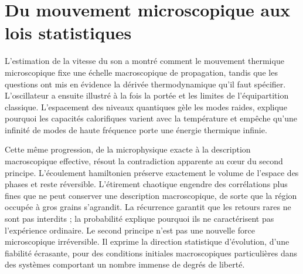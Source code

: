 \section{Du mouvement microscopique aux lois statistiques}

L’estimation de la vitesse du son a montré comment le mouvement thermique microscopique fixe une échelle macroscopique de propagation, tandis que les questions ont mis en évidence la dérivée thermodynamique qu’il faut spécifier. L’oscillateur a ensuite illustré à la fois la portée et les limites de l’équipartition classique. L’espacement des niveaux quantiques gèle les modes raides, explique pourquoi les capacités calorifiques varient avec la température et empêche qu’une infinité de modes de haute fréquence porte une énergie thermique infinie.

Cette même progression, de la microphysique exacte à la description macroscopique effective, résout la contradiction apparente au cœur du second principe. L’écoulement hamiltonien préserve exactement le volume de l’espace des phases et reste réversible. L’étirement chaotique engendre des corrélations plus fines que ne peut conserver une description macroscopique, de sorte que la région occupée à gros grains s’agrandit. La récurrence garantit que les retours rares ne sont pas interdits ; la probabilité explique pourquoi ils ne caractérisent pas l’expérience ordinaire. Le second principe n’est pas une nouvelle force microscopique irréversible. Il exprime la direction statistique d’évolution, d’une fiabilité écrasante, pour des conditions initiales macroscopiques particulières dans des systèmes comportant un nombre immense de degrés de liberté.